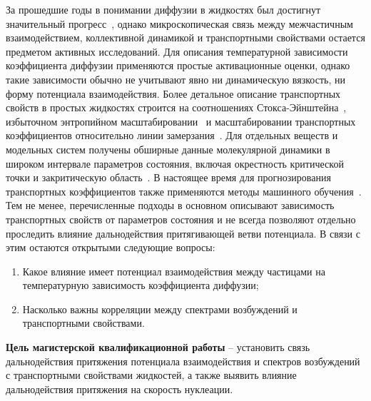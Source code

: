 За прошедшие годы в понимании диффузии в жидкостях был достигнут значительный прогресс~\cite{FrenkelBook,HansenBook,GrootBook,MarchBook}, однако микроскопическая связь между межчастичным взаимодействием, коллективной динамикой и транспортными свойствами остается предметом активных исследований.
Для описания температурной зависимости коэффициента диффузии применяются простые активационные оценки, однако такие зависимости обычно не учитывают явно ни динамическую вязкость, ни форму потенциала взаимодействия.
Более детальное описание транспортных свойств в простых жидкостях строится на соотношениях Стокса-Эйнштейна~\cite{10.1063/1.446338, 10.1002/BBPC.19900940313, 10.1103/physreve.95.052122, 10.1063/1.5080662, 10.1080/00268976.2019.1643045}, избыточном энтропийном масштабировании~\cite{10.1103/physreva.15.2545, 10.1038/381137a0, 10.1063/1.5055064} и масштабировании транспортных коэффициентов относительно линии замерзания~\cite{10.1103/physreve.62.7524, 10.1063/1.5022058, 10.1063/1.5044703, 10.1103/physreve.103.042122}.
Для отдельных веществ и модельных систем получены обширные данные молекулярной динамики в широком интервале параметров состояния, включая окрестность критической точки и закритическую область~\cite{10.1063/1.1607953, 10.1016/j.camwa.2019.11.012, 10.1063/1.441097, 10.1063/1.1786579, 10.1016/j.fluid.2011.03.002}.
В настоящее время для прогнозирования транспортных коэффициентов также применяются методы машинного обучения~\cite{10.1063/5.0011512}.
Тем не менее, перечисленные подходы в основном описывают зависимость транспортных свойств от параметров состояния и не всегда позволяют отдельно проследить влияние дальнодействия притягивающей ветви потенциала.
В связи с этим остаются открытыми следующие вопросы:
\begin{enumerate}
\item Какое влияние имеет потенциал взаимодействия между частицами на температурную зависимость коэффициента диффузии;
\item Насколько важны корреляции между спектрами возбуждений и транспортными свойствами.
\end{enumerate}

\newpage

\textbf{Цель магистерской квалификационной работы} -- установить связь \\ дальнодействия притяжения потенциала взаимодействия и спектров возбуждений с транспортными свойствами жидкостей, а также выявить влияние дальнодействия притяжения на скорость нуклеации.


